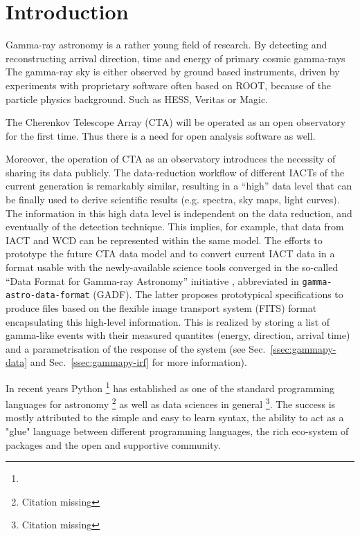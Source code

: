 \section{Introduction}
\label{sec:introduction}


Gamma-ray astronomy is a rather young field of research. By detecting and
reconstructing arrival direction, time and energy of primary cosmic gamma-rays
The gamma-ray sky is either observed by ground based instruments, driven by
experiments with proprietary software often based on ROOT, because of the
particle physics background. Such as HESS, Veritas or Magic.

The Cherenkov Telescope Array (CTA) will be operated as an open observatory for the
first time. Thus there is a need for open analysis software as well.

Moreover, the operation of CTA as an observatory introduces the necessity of sharing
its data publicly. The data-reduction workflow of different IACTs of the current
generation is remarkably similar, resulting in a ``high'' data level that can be
finally used to derive scientific results (e.g. spectra, sky maps, light curves).
The information in this high data level is independent on the data reduction,
and eventually of the detection technique. This implies, for example, that data
from IACT and WCD can be represented within the same model.
The efforts to prototype the future CTA data model and to convert current IACT
data in a format usable with the newly-available science tools converged in the 
so-called ``Data Format for Gamma-ray Astronomy'' initiative
\citep{gadf_proc, gadf_universe}, abbreviated in \texttt{gamma-astro-data-format}
(GADF). The latter proposes prototypical specifications to produce files based
on the flexible image transport system (FITS) format \citep{fits} encapsulating
this high-level information. This is realized by storing a list of gamma-like
events with their measured quantites (energy, direction, arrival time) and a
parametrisation of the response of the system (see Sec.~\ref{ssec:gammapy-data}
and Sec.~\ref{ssec:gammapy-irf} for more information).

In recent years Python \footnote{\PythonUrl} has established as one of the
standard programming  languages for astronomy \footnote{Citation missing} as
well as data sciences in  general \footnote{Citation missing}. The success is
mostly attributed to the simple and easy to learn syntax, the ability to act as
a "glue" language between different programming languages, the rich eco-system
of packages and the open and supportive community.

